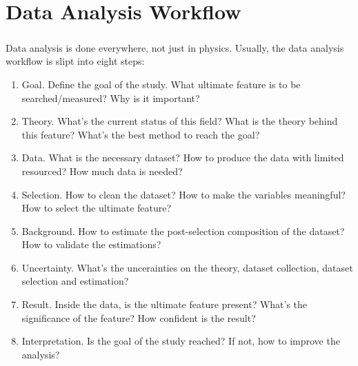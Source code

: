 \chapter{Data Analysis Workflow}
\label{AppendixB}

\paragraph{}
Data analysis is done everywhere, not just in physics. Usually, the data analysis workflow is slipt into eight steps:
\begin{enumerate}
	\item Goal. Define the goal of the study. What ultimate feature is to be searched/measured? Why is it important?
	\item Theory. What's the current status of this field? What is the theory behind this feature? What's the best method to reach the goal? 
	\item Data. What is the necessary dataset? How to produce the data with limited resourced? How much data is needed?
	\item Selection. How to clean the dataset? How to make the variables meaningful? How to select the ultimate feature?
	\item Background. How to estimate the post-selection composition of the dataset? How to validate the estimations? 
	\item Uncertainty. What's the uncerainties on the theory, dataset collection, dataset selection and estimation?
	\item Result. Inside the data, is the ultimate feature present? What's the significance of the feature? How confident is the result?
	\item Interpretation. Is the goal of the study reached? If not, how to improve the analysis?
\end{enumerate}
